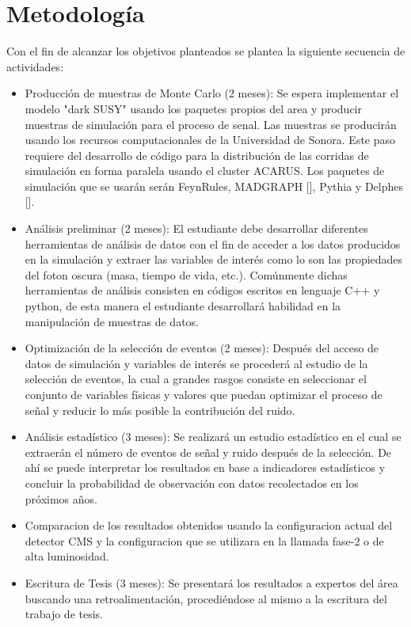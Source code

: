 \chapter{Metodología}

Con el fin de alcanzar los objetivos planteados se plantea la siguiente secuencia de actividades:


\begin{itemize}
    \item Producción de muestras de Monte Carlo (2 meses): Se espera implementar el modelo "dark SUSY" usando los paquetes propios del area y producir muestras de simulación para el proceso de senal. Las muestras se producirán usando los recursos computacionales de la Universidad de Sonora. Este paso requiere del desarrollo de código para la distribución de las corridas de simulación en forma paralela usando el cluster ACARUS. Los paquetes de simulación que se usarán serán FeynRules, MADGRAPH [], Pythia y Delphes [].
    \item Análisis preliminar (2 meses): El estudiante debe desarrollar diferentes herramientas de análisis de datos con el fin de acceder a los datos producidos en la simulación y extraer las variables de interés como lo son las propiedades del foton oscura (masa, tiempo de vida, etc.). Comúnmente dichas herramientas de análisis consisten en códigos escritos en lenguaje C++ y python, de esta manera el estudiante desarrollará habilidad en la manipulación de muestras de datos.
    \item Optimización de la selección de eventos (2 meses): Después del acceso de datos de simulación y variables de interés se procederá al estudio de la selección de eventos, la cual a grandes rasgos consiste en seleccionar el conjunto de variables físicas y valores que puedan optimizar el proceso de señal y reducir lo más posible la contribución del ruido.
    \item Análisis estadístico (3 meses): Se realizará un estudio estadístico en el cual se extraerán el número de eventos de señal y ruido después de la selección. De ahí se puede interpretar los resultados en base a indicadores estadísticos y concluir la probabilidad de observación con datos recolectados en los próximos años.
    \item Comparacion de los resultados obtenidos usando la configuracion actual del detector CMS y la configuracion que se utilizara en la llamada fase-2 o de alta luminosidad. 
    \item Escritura de Tesis (3 meses): Se presentará los resultados a expertos del área buscando una retroalimentación, procediéndose al mismo a la escritura del trabajo de tesis.
\end{itemize}
